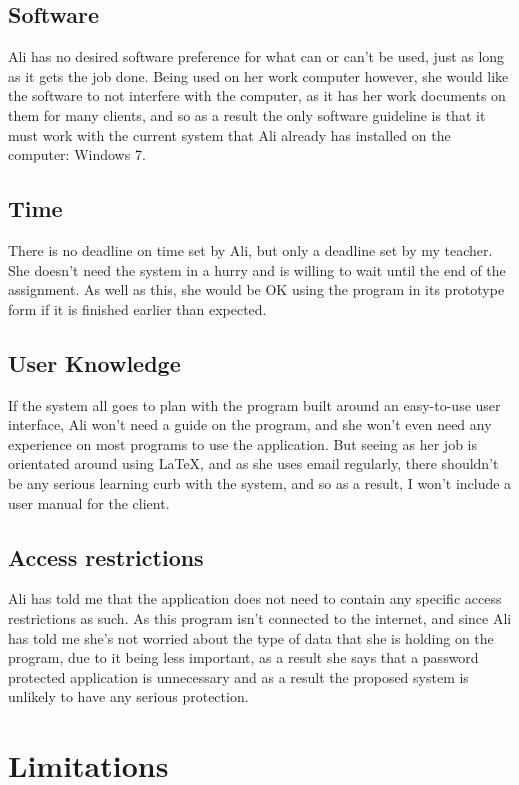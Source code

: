 \subsection{Software}
Ali has no desired software preference for what can or can't be used, just as long as it gets the job done. Being used on her work computer however, she would like the software to not interfere with the computer, as it has her work documents on them for many clients, and so as a result the only software guideline is that it must work with the current system that Ali already has installed on the computer: Windows 7.

\subsection{Time}
There is no deadline on time set by Ali, but only a deadline set by my teacher. She doesn't need the system in a hurry and is willing to wait until the end of the assignment. As well as this, she would be OK using the program in its prototype form if it is finished earlier than expected.

\subsection{User Knowledge}
If the system all goes to plan with the program built around an easy-to-use user interface, Ali won't need a guide on the program, and she won't even need any experience on most programs to use the application. But seeing as her job is orientated around using LaTeX, and as she uses email regularly, there shouldn't be any serious learning curb with the system, and so as a result, I won't include a user manual for the client.

\subsection{Access restrictions}
Ali has told me that the application does not need to contain any specific access restrictions as such. As this program isn't connected to the internet, and since Ali has told me she's not worried about the type of data that she is holding on the program, due to it being less important, as a result she says that a password protected application is unnecessary and as a result the proposed system is unlikely to have any serious protection.


\section{Limitations}

